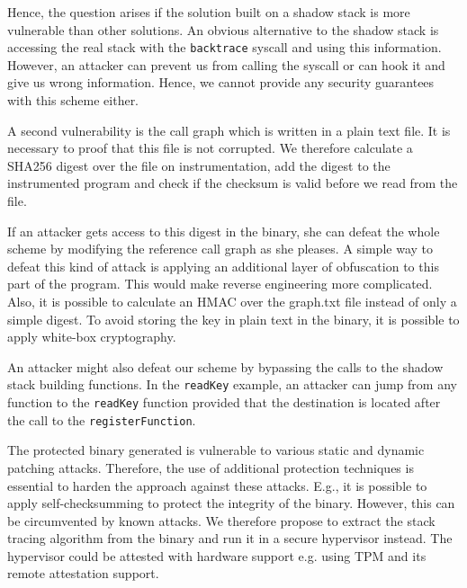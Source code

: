 \documentclass{llncs}
\begin{document}
Hence, the question arises if the solution built on a shadow stack is more vulnerable than other solutions. An obvious alternative to the shadow stack is accessing the real stack with the \texttt{backtrace} syscall and using this information. However, an attacker can prevent us from calling the syscall or can hook it and give us wrong information. Hence, we cannot provide any security guarantees with this scheme either.

A second vulnerability is the call graph which is written in a plain text file. It is necessary to proof that this file is not corrupted. We therefore calculate a SHA256 digest over the file on instrumentation, add the digest to the instrumented program and check if the checksum is valid before we read from the file.

If an attacker gets access to this digest in the binary, she can defeat the whole scheme by modifying the reference call graph as she pleases.
A simple way to defeat this kind of attack is applying an additional layer of obfuscation to this part of the program. This would make reverse engineering more complicated.
Also, it is possible to calculate an HMAC over the graph.txt file instead of only a simple digest. To avoid storing the key in plain text in the binary, it is possible to apply white-box cryptography.

An attacker might also defeat our scheme by bypassing the calls to the shadow stack building functions. In the \texttt{readKey} example, an attacker can jump from any function to the \texttt{readKey} function provided that the destination is located after the call to the \texttt{registerFunction}. %

The protected binary generated is vulnerable to various static and dynamic patching attacks. Therefore, the use of additional protection techniques is essential to harden the approach against these attacks. E.g., it is possible to apply self-checksumming to protect the integrity of the binary. However, this can be circumvented by known attacks. We therefore propose to extract the stack tracing algorithm from the binary and run it in a secure hypervisor instead. The hypervisor could be attested with hardware support e.g. using TPM and its remote attestation support.
\end{document}
